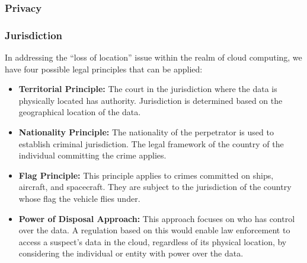 \subsubsection{Privacy} %




\subsubsection{Jurisdiction}  %

In addressing the “loss of location” issue within the realm of cloud computing, we have four possible legal principles that can be applied:

\begin{itemize}
    \item \textbf{Territorial Principle:} The court in the jurisdiction where the data is physically located has authority. Jurisdiction is determined based on the geographical location of the data.
    
    \item \textbf{Nationality Principle:} The nationality of the perpetrator is used to establish criminal jurisdiction. The legal framework of the country of the individual committing the crime applies.
    
    \item \textbf{Flag Principle:} This principle applies to crimes committed on ships, aircraft, and spacecraft. They are subject to the jurisdiction of the country whose flag the vehicle flies under.
    
    \item \textbf{Power of Disposal Approach:} This approach focuses on who has control over the data. A regulation based on this would enable law enforcement to access a suspect's data in the cloud, regardless of its physical location, by considering the individual or entity with power over the data.
\end{itemize}

